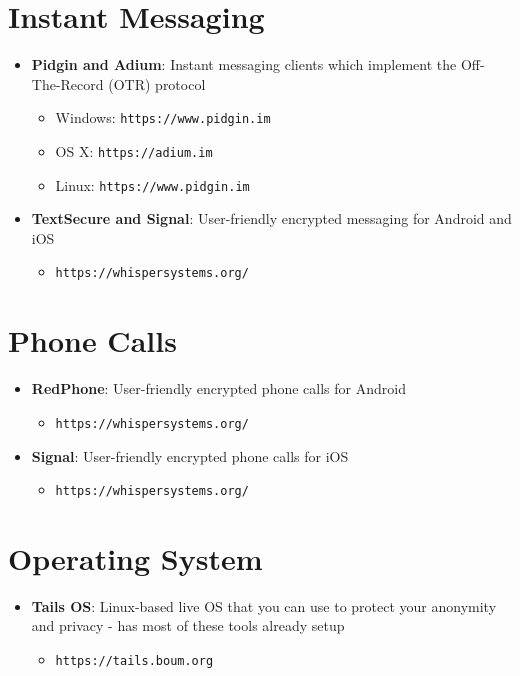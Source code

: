 \documentclass[11pt]{memoir}
\begin{document}
\section*{Instant Messaging}
\begin{itemize}
   \item \textbf{Pidgin and Adium}: Instant messaging clients which implement the Off-The-Record (OTR) protocol
       \begin{itemize}
         \item Windows: \texttt{https://www.pidgin.im}
         \item OS X: \texttt{https://adium.im}
         \item Linux: \texttt{https://www.pidgin.im}
       \end{itemize}
   \item \textbf{TextSecure and Signal}: User-friendly encrypted messaging for Android and iOS
       \begin{itemize}
         \item \texttt{https://whispersystems.org/}
       \end{itemize}
\end{itemize}

\section*{Phone Calls}
\begin{itemize}
   \item \textbf{RedPhone}: User-friendly encrypted phone calls for Android
      \begin{itemize}
         \item \texttt{https://whispersystems.org/}
      \end{itemize}
   \item \textbf{Signal}: User-friendly encrypted phone calls for iOS
      \begin{itemize}
         \item \texttt{https://whispersystems.org/}
      \end{itemize}
\end{itemize}

\section*{Operating System}
\begin{itemize}
   \item \textbf{Tails OS}: Linux-based live OS that you can use to protect your anonymity and privacy - has most of these tools already setup
   \begin{itemize}
       \item \texttt{https://tails.boum.org}
   \end{itemize}
\end{itemize}
\end{document}
